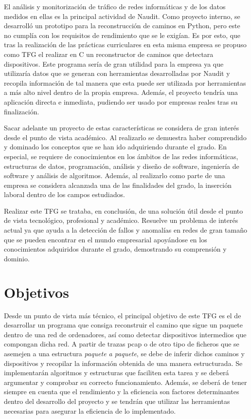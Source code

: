 \documentclass[tfg,epsbased,lof,lot,loa,covers,final,copyright,overleaf]{tfgtfmthesisuam}
\begin{document}
El análisis y monitorización de tráfico de redes informáticas y de los datos medidos en ellas es la principal actividad de Naudit. Como proyecto interno, se desarrolló un prototipo para la reconstrucción de caminos en Python, pero este no cumplía con los requisitos de rendimiento que se le exigían. Es por esto, que tras la realización de las prácticas curriculares en esta misma empresa se propuso como TFG el realizar en C un reconstructor de caminos que detectara dispositivos. Este programa sería de gran utilidad para la empresa ya que utilizaría datos que se generan con herramientas desarrolladas por Naudit y recopila información de tal manera que esta puede ser utilizada por herramientas a más alto nivel dentro de la propia empresa. Además, el proyecto tendría una aplicación directa e inmediata, pudiendo ser usado por empresas reales tras su finalización.

Sacar adelante un proyecto de estas características se considera de gran interés desde el punto de vista académico. Al realizarlo se demuestra haber comprendido y dominado los conceptos que se han ido adquiriendo durante el grado. En especial, se requiere de conocimientos en los ámbitos de las redes informáticas, estructuras de datos, programación, análisis y diseño de software, ingeniería de software y análisis de algoritmos. Además, al realizarlo como parte de una empresa se considera alcanzada una de las finalidades del grado, la inserción laboral dentro de los campos estudiados.

Realizar este TFG se trataba, en conclusión, de una solución útil desde el punto de vista tecnológico, profesional y académico. Resuelve un problema de interés actual ya que ayuda a la detección de fallos y anomalías en redes de gran tamaño que se pueden encontrar en el mundo empresarial apoyándose en los conocimientos adquiridos durante el grado, demostrando su comprensión y dominio. 
\section{Objetivos}
Desde un punto de vista más técnico, el principal objetivo de este TFG es el de desarrollar un programa que consiga reconstruir el camino que sigue un paquete dentro de una red de ordenadores, así como detectar dispositivos intermedios que compongan dicha red. A partir de trazas pcap o de otro tipo de ficheros que se asemejen a una estructura \textit{paquete a paquete}, se debe de inferir dichos caminos y dispositivos y recopilar la información obtenida de una manera estructurada. Se implementarán algoritmos y estructuras que faciliten esta tarea y se deberá argumentar y comprobar su correcto funcionamiento. Además, se deberá de tener siempre en cuenta que el rendimiento y la eficiencia son factores determinantes dentro del desarrollo del proyecto y se tendrán que utilizar las herramientas necesarias para asegurar la eficiencia de lo implementado.
\end{document}
